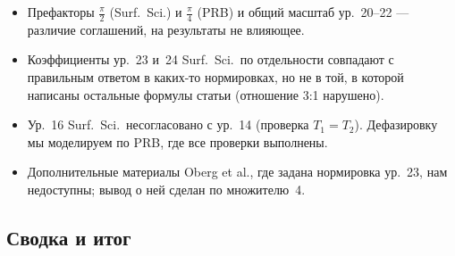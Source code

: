 \begin{cmpbox}
\begin{itemize}
\item Префакторы $\tfrac\pi2$ (Surf.\ Sci.) и $\tfrac\pi4$ (PRB) и общий масштаб ур.~20--22 ---
  различие соглашений, на результаты не влияющее.
\item Коэффициенты ур.~23 и~24 Surf.\ Sci.\ по отдельности совпадают с правильным
  ответом в каких-то нормировках, но не в той, в которой написаны
  остальные формулы статьи (отношение 3:1 нарушено).
\item Ур.~16 Surf.\ Sci.\ несогласовано с ур.~14 (проверка $T_1=T_2$). Дефазировку мы
  моделируем по PRB, где все проверки выполнены.
\item Дополнительные материалы Oberg et al., где задана нормировка ур.~23, нам
  недоступны; вывод о ней сделан по множителю~4.
\end{itemize}
\end{cmpbox}

\subsection{Сводка и итог}
\label{sec:kd_summary}

